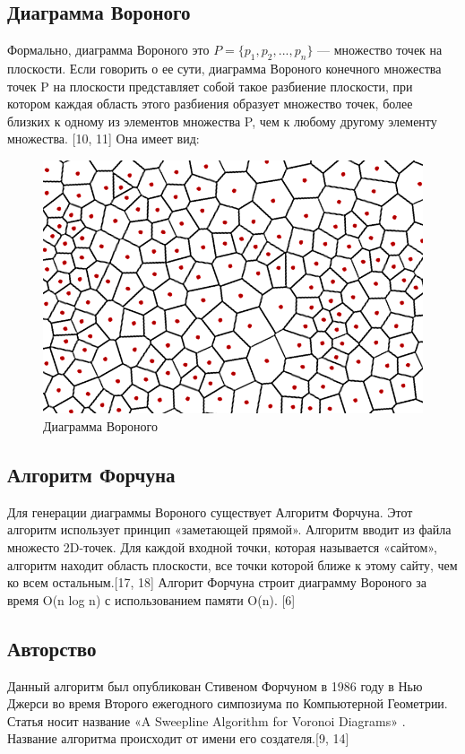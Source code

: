 \subsection{Диаграмма Вороного}
Формально, диаграмма Вороного это $P = \lbrace p_1,p_2,...,p_n \rbrace $ — множество точек на плоскости.
Если говорить о ее сути, диаграмма Вороного конечного множества точек P на плоскости представляет собой такое разбиение плоскости, при котором каждая область этого разбиения образует множество точек, более близких к одному из элементов множества P, чем к любому другому элементу множества. [10, 11]
Она имеет вид:\\
\begin{figure}[H]
\centering
\includegraphics[scale = 0.4]{voronoi}
\caption{\label{tab:widgets}Диаграмма Вороного}
\end{figure}

\subsection{Алгоритм Форчуна}
Для генерации диаграммы Вороного существует Алгоритм Форчуна. Этот алгоритм использует принцип «заметающей прямой». Алгоритм вводит из файла множесто 2D-точек.  Для каждой входной точки, которая называется «сайтом», алгоритм находит область плоскости, все точки которой ближе к этому сайту, чем ко всем остальным.[17, 18] Алгорит Форчуна строит диаграмму Вороного за время O(n log n) с использованием памяти O(n). [6]

\subsection{Авторство}
Данный алгоритм был опубликован Стивеном Форчуном в 1986 году в Нью Джерси во время Второго ежегодного симпозиума по Компьютерной Геометрии. Статья носит название «A Sweepline Algorithm for Voronoi Diagrams» . Название алгоритма происходит от имени его создателя.[9, 14]

